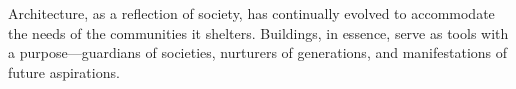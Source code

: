 







Architecture, as a reflection of society, has continually evolved to accommodate the needs of the communities it shelters.
Buildings, in essence, serve as tools with a purpose—guardians of societies, nurturers of generations, and manifestations of future aspirations.

